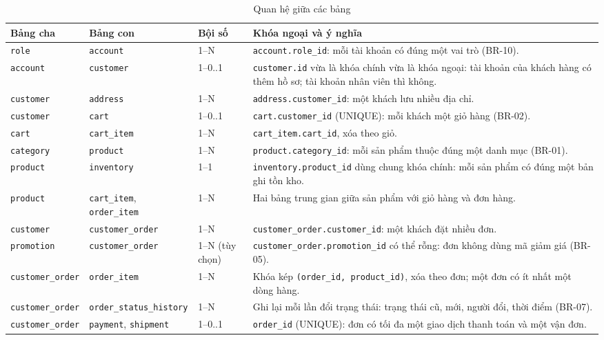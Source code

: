 \documentclass[12pt,a4paper,oneside]{report}
\begin{document}
\begin{longtable}{p{3.2cm}p{3.2cm}p{1.8cm}p{7.6cm}}
\caption{Quan hệ giữa các bảng}\\
\toprule
\textbf{Bảng cha} & \textbf{Bảng con} & \textbf{Bội số} & \textbf{Khóa ngoại và ý nghĩa} \\
\midrule
\endhead
\bottomrule
\endlastfoot
\texttt{role} & \texttt{account} & 1--N & \texttt{account.role\_id}: mỗi tài khoản có đúng một vai trò (BR-10). \\
\texttt{account} & \texttt{customer} & 1--0..1 & \texttt{customer.id} vừa là khóa chính vừa là khóa ngoại: tài khoản của khách hàng có thêm hồ sơ; tài khoản nhân viên thì không. \\
\texttt{customer} & \texttt{address} & 1--N & \texttt{address.customer\_id}: một khách lưu nhiều địa chỉ. \\
\texttt{customer} & \texttt{cart} & 1--0..1 & \texttt{cart.customer\_id} (UNIQUE): mỗi khách một giỏ hàng (BR-02). \\
\texttt{cart} & \texttt{cart\_item} & 1--N & \texttt{cart\_item.cart\_id}, xóa theo giỏ. \\
\texttt{category} & \texttt{product} & 1--N & \texttt{product.category\_id}: mỗi sản phẩm thuộc đúng một danh mục (BR-01). \\
\texttt{product} & \texttt{inventory} & 1--1 & \texttt{inventory.product\_id} dùng chung khóa chính: mỗi sản phẩm có đúng một bản ghi tồn kho. \\
\texttt{product} & \texttt{cart\_item}, \texttt{order\_item} & 1--N & Hai bảng trung gian giữa sản phẩm với giỏ hàng và đơn hàng. \\
\texttt{customer} & \texttt{customer\_order} & 1--N & \texttt{customer\_order.customer\_id}: một khách đặt nhiều đơn. \\
\texttt{promotion} & \texttt{customer\_order} & 1--N (tùy chọn) & \texttt{customer\_order.promotion\_id} có thể rỗng: đơn không dùng mã giảm giá (BR-05). \\
\texttt{customer\_order} & \texttt{order\_item} & 1--N & Khóa kép \texttt{(order\_id, product\_id)}, xóa theo đơn; một đơn có ít nhất một dòng hàng. \\
\texttt{customer\_order} & \texttt{order\_status\_history} & 1--N & Ghi lại mỗi lần đổi trạng thái: trạng thái cũ, mới, người đổi, thời điểm (BR-07). \\
\texttt{customer\_order} & \texttt{payment}, \texttt{shipment} & 1--0..1 & \texttt{order\_id} (UNIQUE): đơn có tối đa một giao dịch thanh toán và một vận đơn. \\

\end{longtable}
\end{document}
